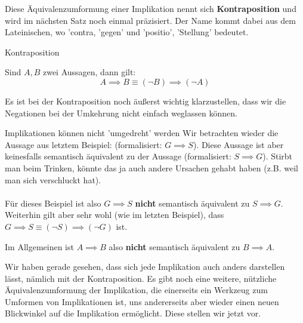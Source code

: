 \documentclass[../../main.tex]{subfiles}
\begin{document}
    Diese Äquivalenzumformung einer Implikation nennt sich \textbf{Kontraposition} 
    und wird im nächsten Satz noch einmal präzisiert.  Der Name kommt dabei aus dem Lateinischen, wo 'contra, 'gegen'
    und 'positio', 'Stellung' bedeutet. 
    
    \begin{lemma}{Kontraposition}

    Sind $A,B$ zwei Aussagen, dann gilt:
        \[A \implies B  \equiv (\lnot B) \implies (\lnot A)\]
    \end{lemma}

    Es ist bei der Kontraposition noch äußerst wichtig klarzustellen, dass wir die Negationen bei der Umkehrung
    nicht einfach weglassen können. 

    \begin{example}{Implikationen können nicht 'umgedreht' werden}
        Wir betrachten wieder die Aussage aus letztem Beispiel:  (formalisiert: $G \implies S$). Diese Aussage ist aber 
        keinesfalls semantisch äquivalent zu der 
        Aussage  (formalisiert: $S \implies G$).
        Stirbt man beim Trinken, könnte das ja auch andere Ursachen gehabt haben (z.B. weil man sich verschluckt hat).
        \\ \\
        Für dieses Beispiel ist also $G \implies S$ \textbf{nicht} semantisch äquivalent zu $S \implies G$.
        Weiterhin gilt aber sehr wohl (wie im letzten Beispiel), 
        dass $G \implies S \equiv (\lnot S) \implies (\lnot G)$ ist.

    \end{example}

    Im Allgemeinen ist $A \implies B$ also \textbf{nicht} semantisch äquivalent zu $B \implies A$.

    Wir haben gerade gesehen, dass sich jede Implikation auch anders darstellen lässt, 
    nämlich mit der Kontraposition. Es gibt noch eine weitere, nützliche Äquivalenzumformung 
    der Implikation, die einerseits ein Werkzeug zum Umformen von Implikationen ist, uns
    andererseits aber wieder einen neuen Blickwinkel auf die Implikation ermöglicht.
    Diese stellen wir jetzt vor.
    
\end{document}
